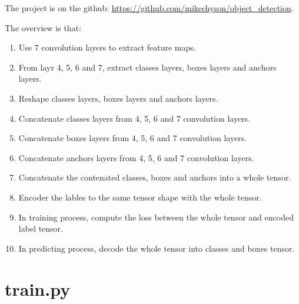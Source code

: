 The project is on the github: \url{https://github.com/mikechyson/object_detection}.


The overview is that:
\begin{enumerate}
\item Use 7 convolution layers to extract feature maps.
\item From layr 4, 5, 6 and 7, extract classes layers, boxes layers and anchors layers.
\item Reshape classes layers, boxes layers and anchors layers.
\item Concatenate classes layers from 4, 5, 6 and 7 convolution layers.
\item Concatenate boxes layers from 4, 5, 6 and 7 convolution layers.
\item Concatenate anchors layers from 4, 5, 6 and 7 convolution layers.
\item Concatenate the contenated classes, boxes and anchors into a whole tensor.
\item Encoder the lables to the same tensor shape with the whole tensor.
\item In training process, compute the loss between the whole tensor and encoded label tensor.
\item In predicting process, decode the whole tensor into classes and boxes tensor.
\end{enumerate}

\section{train.py}


